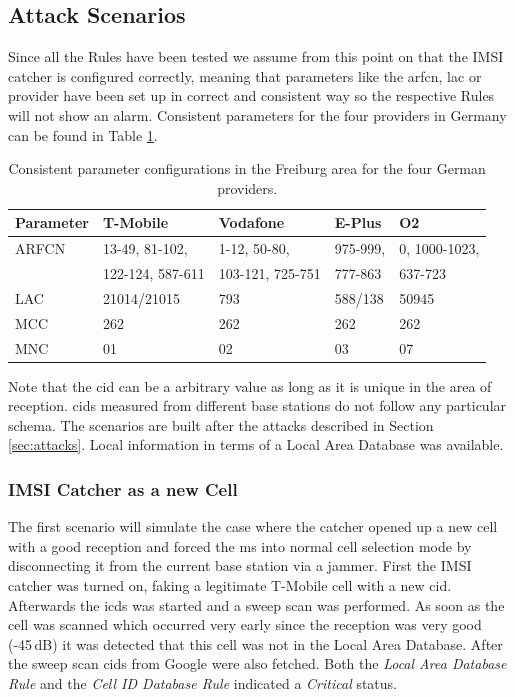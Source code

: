 \subsection{Attack Scenarios}
Since all the  Rules have been tested we assume from this point on that the IMSI catcher is configured correctly, meaning that parameters like the \gls{arfcn}, \gls{lac} or provider have been set up in correct and consistent way so the respective Rules will not show an alarm.
Consistent parameters for the four providers in Germany can be found in Table \ref{tab:consistent_parameters}.
\begin{table}
\centering
\begin{tabular}{lllll}
\toprule
Parameter	&T-Mobile				&Vodafone			&E-Plus			&O2\\
\midrule
ARFCN		&13-49, 81-102,			&1-12, 50-80,		&975-999,		&0, 1000-1023,\\
			&122-124, 587-611		&103-121, 725-751	&777-863		&637-723\\
LAC			&21014/21015			&793				&588/138		&50945\\
MCC			&262					&262				&262			&262\\
MNC			&01						&02					&03				&07\\
\bottomrule
\end{tabular}
\caption{Consistent parameter configurations in the Freiburg area for the four German providers.}
\label{tab:consistent_parameters}
\end{table}
Note that the \gls{cid} can be a arbitrary value as long as it is unique in the area of reception. 
\glspl{cid} measured from different base stations do not follow any particular schema.
The scenarios are built after the attacks described in Section \ref{sec:attacks}.
Local information in terms of a Local Area Database was available.

\subsubsection{IMSI Catcher as a new Cell}
The first scenario will simulate the case where the catcher opened up a new cell with a good reception and forced the \gls{ms} into normal cell selection mode by disconnecting it from the current base station via a jammer.
First the IMSI catcher was turned on, faking a legitimate T-Mobile cell with a new \gls{cid}.
Afterwards the \gls{icds} was started and a sweep scan was performed.
As soon as the cell was scanned which occurred very early since the reception was very good (-45\,dB) it was detected that this cell was not in the Local Area Database.
After the sweep scan \glspl{cid} from Google were also fetched.
Both the \emph{Local Area Database Rule} and the \emph{Cell ID Database Rule} indicated a \emph{Critical} status.

